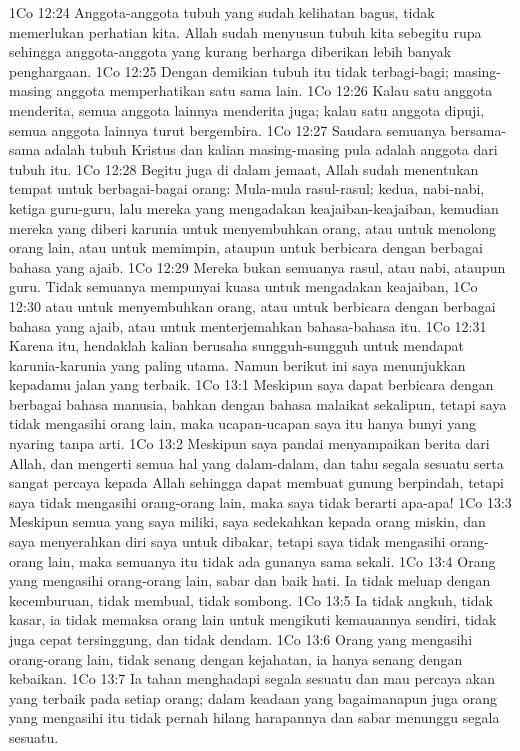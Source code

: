 1Co 12:24  Anggota-anggota tubuh yang sudah kelihatan bagus, tidak memerlukan perhatian kita. Allah sudah menyusun tubuh kita sebegitu rupa sehingga anggota-anggota yang kurang berharga diberikan lebih banyak penghargaan.
1Co 12:25  Dengan demikian tubuh itu tidak terbagi-bagi; masing-masing anggota memperhatikan satu sama lain.
1Co 12:26  Kalau satu anggota menderita, semua anggota lainnya menderita juga; kalau satu anggota dipuji, semua anggota lainnya turut bergembira.
1Co 12:27  Saudara semuanya bersama-sama adalah tubuh Kristus dan kalian masing-masing pula adalah anggota dari tubuh itu.
1Co 12:28  Begitu juga di dalam jemaat, Allah sudah menentukan tempat untuk berbagai-bagai orang: Mula-mula rasul-rasul; kedua, nabi-nabi, ketiga guru-guru, lalu mereka yang mengadakan keajaiban-keajaiban, kemudian mereka yang diberi karunia untuk menyembuhkan orang, atau untuk menolong orang lain, atau untuk memimpin, ataupun untuk berbicara dengan berbagai bahasa yang ajaib.
1Co 12:29  Mereka bukan semuanya rasul, atau nabi, ataupun guru. Tidak semuanya mempunyai kuasa untuk mengadakan keajaiban,
1Co 12:30  atau untuk menyembuhkan orang, atau untuk berbicara dengan berbagai bahasa yang ajaib, atau untuk menterjemahkan bahasa-bahasa itu.
1Co 12:31  Karena itu, hendaklah kalian berusaha sungguh-sungguh untuk mendapat karunia-karunia yang paling utama. Namun berikut ini saya menunjukkan kepadamu jalan yang terbaik.
1Co 13:1  Meskipun saya dapat berbicara dengan berbagai bahasa manusia, bahkan dengan bahasa malaikat sekalipun, tetapi saya tidak mengasihi orang lain, maka ucapan-ucapan saya itu hanya bunyi yang nyaring tanpa arti.
1Co 13:2  Meskipun saya pandai menyampaikan berita dari Allah, dan mengerti semua hal yang dalam-dalam, dan tahu segala sesuatu serta sangat percaya kepada Allah sehingga dapat membuat gunung berpindah, tetapi saya tidak mengasihi orang-orang lain, maka saya tidak berarti apa-apa!
1Co 13:3  Meskipun semua yang saya miliki, saya sedekahkan kepada orang miskin, dan saya menyerahkan diri saya untuk dibakar, tetapi saya tidak mengasihi orang-orang lain, maka semuanya itu tidak ada gunanya sama sekali.
1Co 13:4  Orang yang mengasihi orang-orang lain, sabar dan baik hati. Ia tidak meluap dengan kecemburuan, tidak membual, tidak sombong.
1Co 13:5  Ia tidak angkuh, tidak kasar, ia tidak memaksa orang lain untuk mengikuti kemauannya sendiri, tidak juga cepat tersinggung, dan tidak dendam.
1Co 13:6  Orang yang mengasihi orang-orang lain, tidak senang dengan kejahatan, ia hanya senang dengan kebaikan.
1Co 13:7  Ia tahan menghadapi segala sesuatu dan mau percaya akan yang terbaik pada setiap orang; dalam keadaan yang bagaimanapun juga orang yang mengasihi itu tidak pernah hilang harapannya dan sabar menunggu segala sesuatu.
